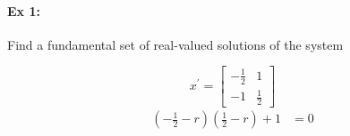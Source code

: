 \documentclass[letterpaper,12pt]{article}
\begin{document}
\paragraph{Ex 1:} Find a fundamental set of real-valued solutions of the system

\[
    x^{\prime}= \begin{bmatrix}
        -\frac{1}{2} & 1\\
        -1 & \frac{1}{2}
    \end{bmatrix}
\]
\begin{align*}
    (-\frac{1}{2}-r)(\frac{1}{2}-r)+1&=0\\
\end{align*}
\end{document}
